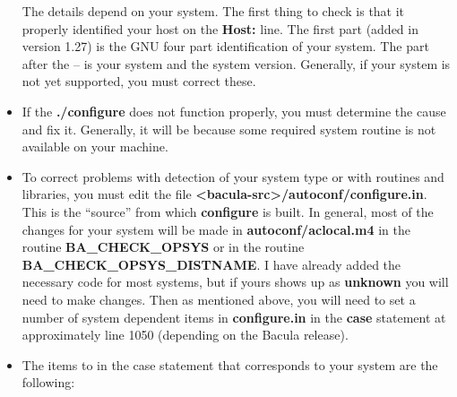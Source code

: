 \begin{itemize}
The details depend on your system. The first thing to check is that  it
properly identified your host on the {\bf Host:} line. The  first part (added
in version 1.27) is the GNU four part identification  of your system. The part
after the -- is your system and the system version.  Generally, if your system
is not yet supported, you must correct these.
\item If the {\bf ./configure} does not function properly, you must  determine
   the cause and fix it. Generally, it will be because some  required system
   routine is not available on your machine.
\item To correct problems with detection of your system type or with routines
   and libraries, you must edit the file {\bf
   {\textless}bacula-src{\textgreater}/autoconf/configure.in}.  This is the ``source'' from
which {\bf configure} is built.  In general, most of the changes for your
system will be made in  {\bf autoconf/aclocal.m4} in the routine {\bf
BA\_CHECK\_OPSYS} or  in the routine {\bf BA\_CHECK\_OPSYS\_DISTNAME}. I have
already added the  necessary code for most systems, but if yours shows up as
{\bf unknown}  you will need to make changes. Then as mentioned above, you
will need  to set a number of system dependent items in {\bf configure.in} in
the  {\bf case} statement at approximately line 1050 (depending on the  Bacula
release).
\item The items to in the case statement that corresponds to your system  are
   the following:


\end{itemize}
